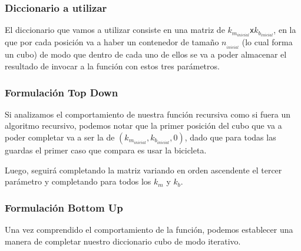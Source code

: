 

\bigskip

\subsubsection*{Diccionario a utilizar}

El diccionario que vamos a utilizar consiste en una matriz de $k_{m_{inicial}}$\texttt{x}$k_{b_{inicial}}$, en la que por cada posici\'on va a haber un contenedor de tama\~no $n_{_{inicial}}$ (lo cual forma un cubo) de modo que dentro de cada uno de ellos se va a poder almacenar el resultado de invocar a la funci\'on con estos tres par\'ametros.

\subsubsection*{Formulaci\'on Top Down}


Si analizamos el comportamiento de nuestra funci\'on recursiva como si fuera un algoritmo recursivo, podemos notar que la primer posici\'on del cubo que va a poder completar va a ser la de $(k_{m_{inicial}},k_{b_{inicial}},0)$, dado que para todas las guardas el primer caso que compara es usar la bicicleta. 

Luego, seguir\'a completando la matriz variando en orden ascendente el tercer par\'ametro y completando para todos los $k_m$ y $k_b$.

\subsubsection*{Formulaci\'on Bottom Up}

Una vez comprendido el comportamiento de la funci\'on, podemos establecer una manera de completar nuestro diccionario cubo de modo iterativo.\\

